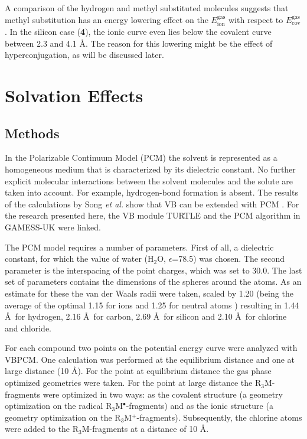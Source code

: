 A comparison of the hydrogen and methyl substituted molecules suggests that methyl substitution has an energy lowering effect on the $E_\mathrm{ion}^\mathrm{gas}$ with respect to $E_\mathrm{cov}^\mathrm{gas}$. In the silicon case (\textbf{4}), the ionic curve even lies below the covalent curve between 2.3 and 4.1 \AA. The reason for this lowering might be the effect of hyperconjugation, as will be discussed later.

\section{\label{ch3.sec.solv}Solvation Effects}

\subsection{Methods}

In the Polarizable Continuum Model (PCM) the solvent is represented as a homogeneous medium that is characterized by its dielectric constant. No further explicit molecular interactions between the solvent molecules and the solute are taken into account. For example, hydrogen-bond formation is absent. The results of the calculations by Song \textit{et al.} show that VB can  be extended with PCM \cite{song}. For the research presented here, the VB module TURTLE and the PCM algorithm in GAMESS-UK were linked.

The PCM model requires a number of parameters. First of all, a dielectric constant, for which the value of water (H$_2$O, $\epsilon$=78.5) was chosen. The second parameter is the interspacing of the point charges, which was set to 30.0\degrees. The last set of parameters contains the dimensions of the spheres around the atoms. As an estimate for these the van der Waals radii \cite{bondi} were taken, scaled by 1.20 (being the average of the optimal 1.15 for ions and 1.25 for neutral atoms \cite{scaling}) resulting in 1.44 \AA\  for hydrogen, 2.16 \AA\  for carbon, 2.69 \AA\ for silicon and 2.10 \AA\ for chlorine and chloride.

For each compound two points on the potential energy curve were analyzed with VBPCM. One calculation was performed at the equilibrium distance and one at large distance (10 \AA). For the point at equilibrium distance the gas phase optimized geometries were taken. For the point at large distance the R$_3$M-fragments were optimized in two ways: as the covalent structure (a geometry optimization on the radical R$_3$M$^\bullet$-fragments) and as the ionic structure (a geometry optimization on the R$_3$M$^{+}$-fragments). Subsequently, the chlorine atoms were added to the R$_3$M-fragments at a distance of 10 \AA. 

